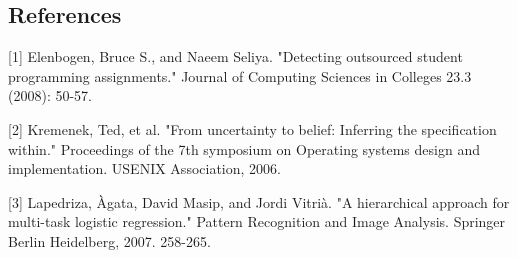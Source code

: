 \subsection*{References}

\small{
[1] Elenbogen, Bruce S., and Naeem Seliya. 
"Detecting outsourced student programming assignments." 
Journal of Computing Sciences in Colleges 23.3 (2008): 50-57.

[2] Kremenek, Ted, et al. 
"From uncertainty to belief: Inferring the specification within." 
Proceedings of the 7th symposium on Operating systems design and implementation. USENIX Association, 2006.

[3] Lapedriza, Àgata, David Masip, and Jordi Vitrià. 
"A hierarchical approach for multi-task logistic regression." 
Pattern Recognition and Image Analysis. Springer Berlin Heidelberg, 2007. 258-265.
}

